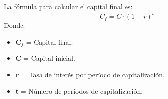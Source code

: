 \documentclass[11pt]{article}
\begin{document}
La fórmula para calcular el capital final es:
\begin{equation*}
C_f = C \cdot (1 + r)^t
\end{equation*}
Donde:
\begin{itemize}
    \item \textbf{C$_f$} = Capital final.
    \item \textbf{C} = Capital inicial.
    \item \textbf{r} = Tasa de interés por período de capitalización.
    \item \textbf{t} = Número de períodos de capitalización.
\end{itemize}
\end{document}
